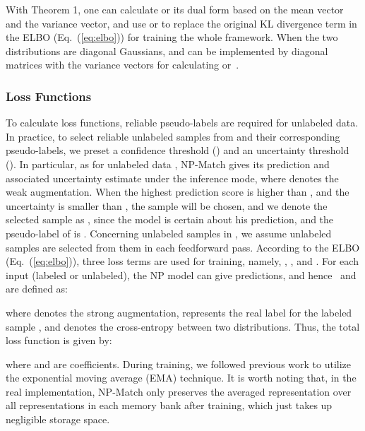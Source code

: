 \documentclass[nohyperref]{article}
\theoremstyle{plain}
\theoremstyle{definition}
\theoremstyle{remark}
\begin{document}
With Theorem 1, one can calculate  or its dual form  based on the mean vector and the variance vector, and use  or  to replace the original KL divergence term in the ELBO (Eq.~(\ref{eq:elbo})) for training the whole framework. When the two distributions are diagonal Gaussians,  and  can be implemented by diagonal matrices with the variance vectors for calculating  or~. 

\subsubsection{Loss Functions} 





To calculate loss functions, reliable pseudo-labels are required for unlabeled data. In practice, to select reliable unlabeled samples from  and  their corresponding pseudo-labels, we preset a confidence threshold () and an uncertainty threshold (). In particular, as for unlabeled data , NP-Match gives its prediction  and associated uncertainty estimate under the inference mode, where  denotes the weak augmentation. When the highest prediction score  is higher than , and the uncertainty is smaller than , the sample will be chosen, and we denote the selected sample as , since the model is certain about his prediction, and the pseudo-label of  is . 
Concerning  unlabeled samples in , we assume  unlabeled samples are selected from them in each feedforward pass. 
According to the ELBO (Eq.~(\ref{eq:elbo})), three loss terms are used for training, namely, , , and . 
For each input (labeled or unlabeled), the NP model can give  predictions, and hence~ and  are defined as:
 
where  denotes the strong augmentation,  represents the real label for the labeled sample , and  denotes the cross-entropy between two distributions. Thus, the total loss function is given by:

where  and  are coefficients. During training, we followed previous work \cite{sohn2020fixmatch,zhang2021flexmatch, rizve2021defense, li2021comatch} to utilize  the exponential moving average (EMA) technique. It is worth noting that, in the real implementation, NP-Match only preserves the averaged representation over all representations in each memory bank after training, which just takes up negligible storage space. 
\end{document}
